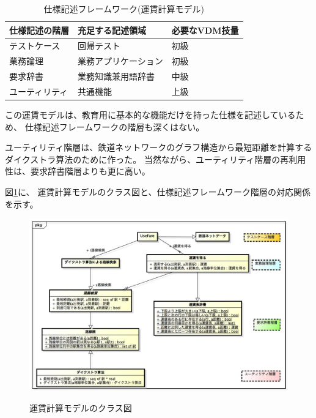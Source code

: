 \begin{table}[h]
	\caption[仕様記述フレームワーク(フェリカネットワークス)]{仕様記述フレームワーク(運賃計算モデル)}
	\label{SpecFrameFare}
	\begin{center}
		\setlength{\tabcolsep}{3pt}
		\begin{tabular}{|l|l|l|} \hline
			仕様記述の階層 & 充足する記述領域 & 必要なVDM技量  \\ \hline\hline
			テストケース  & 回帰テスト & 初級 \\ \hline
			業務論理  & 業務アプリケーション & 初級 \\ \hline
			要求辞書  & 業務知識兼用語辞書 & 中級 \\ \hline
			ユーティリティ  & 共通機能 & 上級 \\ \hline
		\end{tabular}
	\end{center}
\end{table}

	この運賃モデルは、教育用に基本的な機能だけを持った仕様を記述しているため、
	仕様記述フレームワークの階層も深くはない。

	ユーティリティ階層は、鉄道ネットワークのグラフ構造から最短距離を計算する
	ダイクストラ算法のために作った。
	当然ながら、ユーティリティ階層の再利用性は、要求辞書階層よりも更に高い。

	図\ref{fig:ClassDiagram4Fare}に、
	運賃計算モデルのクラス図と、仕様記述フレームワーク階層の対応関係を示す。

\begin{figure}[h]
	\centering
	{\includegraphics[width=55zw, keepaspectratio]{./Fare/image/ClassDiagram.jpg}}
	\caption{運賃計算モデルのクラス図}
	\label{fig:ClassDiagram4Fare}
\end{figure}

